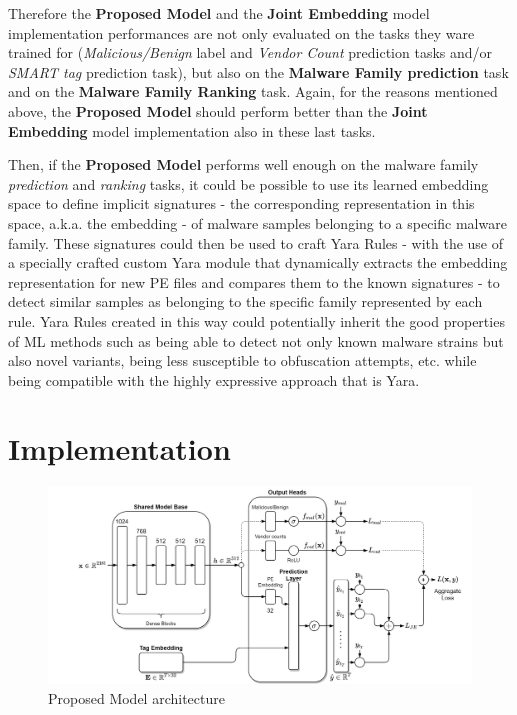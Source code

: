 \documentclass[pdfa%
,cucitura%
]{toptesi}
\begin{document}
Therefore the \textbf{Proposed Model} and the \textbf{Joint Embedding} model implementation performances are not only evaluated on the tasks they ware trained for (\textit{Malicious/Benign} label and \textit{Vendor Count} prediction tasks and/or \textit{SMART tag} prediction task), but also on the \textbf{Malware Family prediction} task and on the \textbf{Malware Family Ranking} task. Again, for the reasons mentioned above, the \textbf{Proposed Model} should perform better than the \textbf{Joint Embedding} model implementation also in these last tasks.

Then, if the \textbf{Proposed Model} performs well enough on the malware family \textit{prediction} and \textit{ranking} tasks, it could be possible to use its learned embedding space to define implicit signatures - the corresponding representation in this space, a.k.a. the embedding - of malware samples belonging to a specific malware family. These signatures could then be used to craft Yara Rules - with the use of a specially crafted custom Yara module that dynamically extracts the embedding representation for new PE files and compares them to the known signatures - to detect similar samples as belonging to the specific family represented by each rule. Yara Rules created in this way could potentially inherit the good properties of ML methods such as being able to detect not only known malware strains but also novel variants, being less susceptible to obfuscation attempts, etc. while being compatible with the highly expressive approach that is Yara.

\section{Implementation}\label{sec:proposedModelImplementation}
\begin{figure}[h!]
	\centering
	\includegraphics[width=\textwidth]{./images/Proposed_Model.png}
	\caption[Proposed model architecture]{Proposed Model architecture}
	\label{fig:Proposed_Model}
\end{figure}
\end{document}
